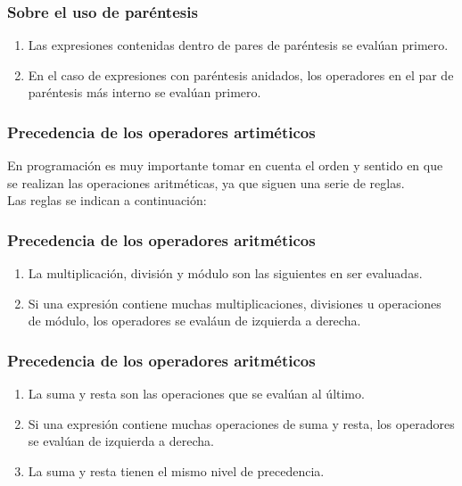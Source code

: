 \documentclass[12pt]{beamer}
\begin{document}
\begin{frame}
\frametitle{Sobre el uso de paréntesis}
\begin{enumerate}[<+->]
\item Las expresiones contenidas dentro de pares de paréntesis se evalúan primero.
\item En el caso de expresiones con paréntesis anidados, los operadores en el par de paréntesis más interno se evalúan primero.
\end{enumerate}
\end{frame}
\begin{frame}
\frametitle{Precedencia de los operadores artiméticos}
En programación es muy importante tomar en cuenta el orden y sentido en que se realizan las operaciones aritméticas, ya que siguen una serie de reglas.
\\
\bigskip
\pause
Las reglas se indican a continuación:
\end{frame}
\begin{frame}
\frametitle{Precedencia de los operadores aritméticos}
\begin{enumerate}[<+->]
\item La multiplicación, división y módulo son las siguientes en ser evaluadas. 
\item Si una expresión contiene muchas multiplicaciones, divisiones u operaciones de módulo, los operadores se evaláun de izquierda a derecha.
\seti
\end{enumerate}
\end{frame}
\begin{frame}
\frametitle{Precedencia de los operadores aritméticos}
\begin{enumerate}[<+->]
\conti
\item La suma y resta son las operaciones que se evalúan al último. 
\item Si una expresión contiene muchas operaciones de suma y resta, los operadores se evalúan de izquierda a derecha.
\item La suma y resta tienen el mismo nivel de precedencia.
\end{enumerate}
\end{frame}
\end{document}
